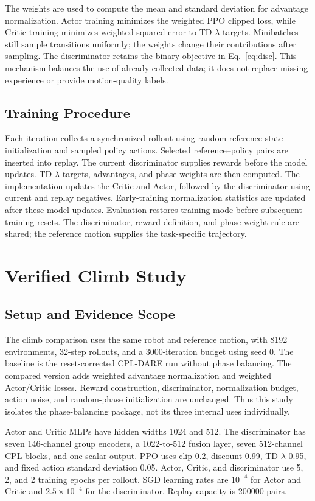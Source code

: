 \documentclass[letterpaper,10pt,conference]{ieeeconf}
\begin{document}
The weights are used to compute the mean and standard deviation for
advantage normalization. Actor training minimizes the weighted PPO
clipped loss, while Critic training minimizes weighted squared error to
TD-$\lambda$ targets. Minibatches still sample transitions uniformly;
the weights change their contributions after sampling. The discriminator
retains the binary objective in Eq.~\eqref{eq:disc}. This mechanism
balances the use of already collected data; it does not replace missing
experience or provide motion-quality labels.

\subsection{Training Procedure}
Each iteration collects a synchronized rollout using random reference-state
initialization and sampled policy actions. Selected reference--policy pairs
are inserted into replay. The current discriminator supplies rewards before
the model updates. TD-$\lambda$ targets, advantages, and phase weights
are then computed. The implementation updates the Critic and Actor, followed
by the discriminator using current and replay negatives. Early-training
normalization statistics are updated after these model updates.
Evaluation restores training mode before subsequent training resets.
The discriminator, reward definition, and phase-weight rule are shared;
the reference motion supplies the task-specific trajectory.

\section{Verified Climb Study}
\subsection{Setup and Evidence Scope}
The climb comparison uses the same robot and reference motion, with 8192
environments, 32-step rollouts, and a 3000-iteration budget using seed 0.
The baseline is the reset-corrected CPL-DARE run without phase balancing.
The compared version adds weighted advantage normalization and weighted
Actor/Critic losses. Reward construction, discriminator, normalization
budget, action noise, and random-phase initialization are unchanged.
Thus this study isolates the phase-balancing package, not its three
internal uses individually.

Actor and Critic MLPs have hidden widths 1024 and 512. The discriminator
has seven 146-channel group encoders, a 1022-to-512 fusion layer, seven
512-channel CPL blocks, and one scalar output. PPO uses clip 0.2,
discount 0.99, TD-$\lambda$ 0.95, and fixed action standard deviation
0.05. Actor, Critic, and discriminator use 5, 2, and 2 training epochs
per rollout. SGD learning rates are $10^{-4}$ for Actor and Critic and
$2.5\times10^{-4}$ for the discriminator. Replay capacity is 200000 pairs.
\end{document}
